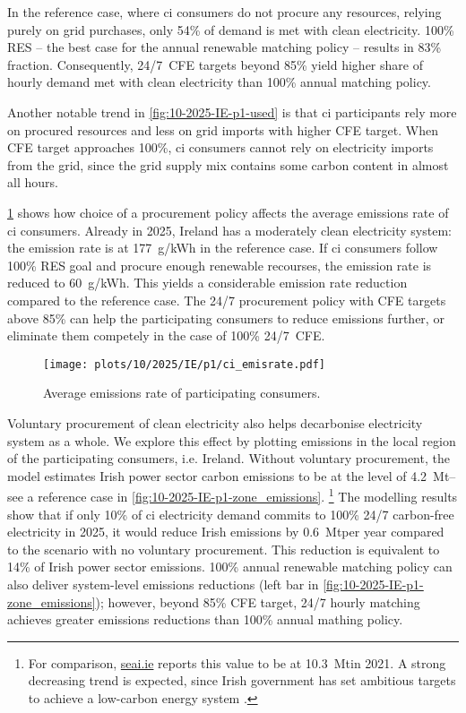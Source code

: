 In the reference case, where \gls{ci} consumers do not procure any resources, relying purely on grid purchases, only 54\% of demand is met with clean electricity.
100\% RES -- the best case for the annual renewable matching policy -- results in 83\% fraction. 
Consequently, 24/7~CFE targets beyond 85\% yield higher share of hourly demand met with clean electricity than 100\% annual matching policy.

Another notable trend in \cref{fig:10-2025-IE-p1-used} is that \gls{ci} participants rely more on procured resources and less on grid imports with higher CFE target.
When CFE target approaches 100\%, \gls{ci} consumers cannot rely on electricity imports from the grid, since the grid supply mix contains some carbon content in almost all hours.

\cref{fig:10-2025-IE-p1-ci_emisrate} shows how choice of a procurement policy affects the average emissions rate of \gls{ci} consumers.
Already in 2025, Ireland has a moderately clean electricity system: the emission rate is at 177~g\co/kWh in the reference case. 
If \gls{ci} consumers follow 100\% RES goal and procure enough renewable recourses, the emission rate is reduced to 60~g\co/kWh.
This yields a considerable emission rate reduction compared to the reference case.
The 24/7 procurement policy with CFE targets above 85\% can help the participating consumers to reduce emissions further, or eliminate them competely in the case of 100\% 24/7~CFE.

\begin{figure}
    \centering
    \texttt{[image: plots/10/2025/IE/p1/ci\_emisrate.pdf]}
    \caption{Average emissions rate of participating consumers.}
    \label{fig:10-2025-IE-p1-ci_emisrate}
\end{figure}

Voluntary procurement of clean electricity also helps decarbonise electricity system as a whole.
We explore this effect by plotting \co emissions in the local region of the participating consumers, i.e. Ireland.
Without voluntary procurement, the model estimates Irish power sector carbon emissions to be at the level of 4.2~Mt\co -- see a reference case in \cref{fig:10-2025-IE-p1-zone_emissions}.
\footnote{For comparison, \href{https://www.seai.ie/data-and-insights/seai-statistics/key-publications/co2-emissions-report/}{seai.ie} reports this value to be at 10.3~Mt\co in 2021.
A strong decreasing trend is expected, since Irish government has set ambitious targets to achieve a low-carbon energy system \cite{SEAI}.}
The modelling results show that if only 10\% of \gls{ci} electricity demand commits to 100\% 24/7 carbon-free electricity in 2025, it would reduce Irish emissions by 0.6~Mt\co per year compared to the scenario with no voluntary procurement.
This reduction is equivalent to 14\% of Irish power sector emissions.
100\% annual renewable matching policy can also deliver system-level \co emissions reductions (left bar in \cref{fig:10-2025-IE-p1-zone_emissions}); however, beyond 85\% CFE target, 24/7 hourly matching achieves greater emissions reductions than 100\% annual mathing policy.

